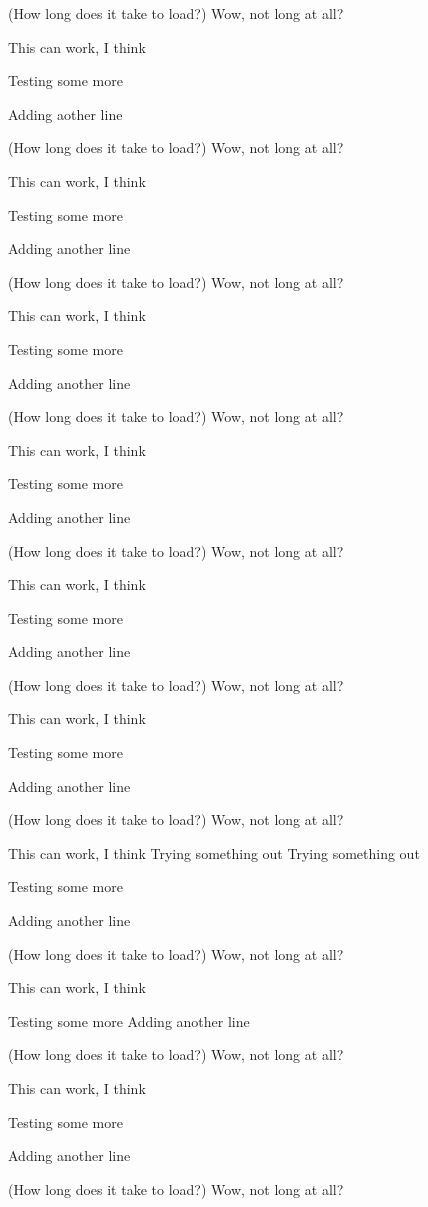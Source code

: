 \documentclass{article}
\begin{document}
(How long does it take to load?)
Wow, not long at all?

This can work, I think

Testing some more

Adding aother line

(How long does it take to load?)
Wow, not long at all?

This can work, I think

Testing some more

Adding another line

(How long does it take to load?)
Wow, not long at all?

This can work, I think

Testing some more

Adding another line

(How long does it take to load?)
Wow, not long at all?

This can work, I think

Testing some more

Adding another line

(How long does it take to load?)
Wow, not long at all?

This can work, I think

Testing some more

Adding another line

(How long does it take to load?)
Wow, not long at all?

This can work, I think

Testing some more

Adding another line

(How long does it take to load?)
Wow, not long at all?

This can work, I think
Trying something out
Trying something out

Testing some more

Adding another line

(How long does it take to load?)
Wow, not long at all?

This can work, I think

Testing some more
Adding another line

(How long does it take to load?)
Wow, not long at all?

This can work, I think

Testing some more

Adding another line

(How long does it take to load?)
Wow, not long at all?
\end{document}
